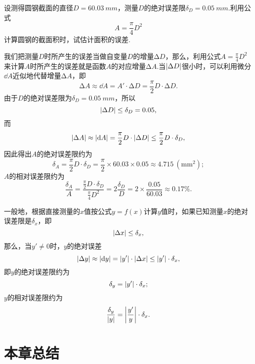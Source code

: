\begin{example}
设测得圆钢截面的直径\(D = 60.03\ mm\)，测量\(D\)的绝对误差限\(\delta_D = 0.05\ mm\).利用公式\[
A = \frac{\pi}{4} D^2
\]计算圆钢的截面积时，试估计面积的误差.
\begin{solution}
我们把测量\(D\)时所产生的误差当做自变量\(D\)的增量\(\increment D\)，那么，利用公式\(A = \frac{\pi}{4} D^2\)来计算\(A\)时所产生的误差就是函数\(A\)的对应增量\(\increment A\).当\(\abs{\Delta D}\)很小时，可以利用微分\(\dd A\)近似地代替增量\(\increment A\)，即\[
\increment A \approx \dd A = A' \cdot \increment D = \frac{\pi}{2} D \cdot \increment D.
\]由于\(D\)的绝对误差限为\(\delta_D = 0.05\ mm\)，所以\[
\abs{\Delta D} \leq \delta_D = 0.05,
\]而\[
\abs{\Delta A} \approx \abs{\dd A} = \frac{\pi}{2} D \cdot \abs{\Delta D} \leq \frac{\pi}{2} D \cdot \delta_D,
\]因此得出\(A\)的绝对误差限约为\[
\delta_A = \frac{\pi}{2} D \cdot \delta_D = \frac{\pi}{2} \times 60.03 \times 0.05 \approx 4.715\ (\mathrm{mm}^2);
\]\(A\)的相对误差限约为\[
\frac{\delta_A}{A} = \frac{\frac{\pi}{2} D \cdot \delta_D}{\frac{\pi}{4} D^2}
= 2 \frac{\delta_D}{D} = 2 \times \frac{0.05}{60.03} \approx 0.17\%.
\]
\end{solution}
\end{example}

一般地，根据直接测量的\(x\)值按公式\(y = f(x)\)计算\(y\)值时，如果已知测量\(x\)的绝对误差限是\(\delta_x\)，即\[
\abs{\Delta x} \leq \delta_x,
\]那么，当\(y' \neq 0\)时，\(y\)的绝对误差\[
\abs{\Delta y} \approx \abs{\dd{y}} = \abs{y'} \cdot \abs{\Delta x} \leq \abs{y'} \cdot \delta_x,
\]即\(y\)的绝对误差限约为\[
\delta_y = \abs{y'} \cdot \delta_x;
\]\(y\)的相对误差限约为\[
\frac{\delta_y}{\abs{y}} = \abs{\frac{y'}{y}} \cdot \delta_x.
\]

\section{本章总结}
